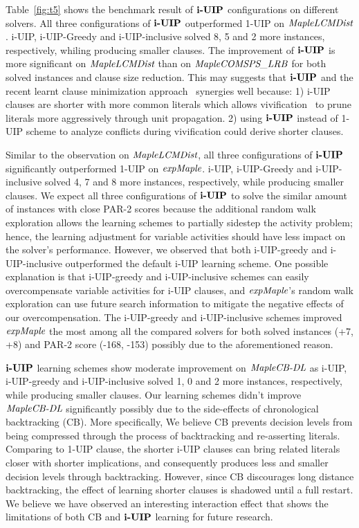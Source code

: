Table~\ref{fig:t5} shows the benchmark result of $\textbf{i-UIP}$ configurations on different solvers. All three configurations of $\textbf{i-UIP}$ outperformed 1-UIP on $\textit{MapleLCMDist}$. i-UIP, i-UIP-Greedy and i-UIP-inclusive solved 8, 5 and 2 more instances, respectively, whiling producing smaller clauses.  The improvement of $\textbf{i-UIP}$ is more significant on $\textit{MapleLCMDist}$ than on $\textit{MapleCOMSPS\_LRB}$ for both solved instances and clause size reduction. This may suggests that $\textbf{i-UIP}$ and the recent learnt clause minimization approach~\cite{} synergies well because: 1) i-UIP clauses are shorter with more common literals which allows vivification~\cite{} to prune literals more aggressively through unit propagation. 2) using $\textbf{i-UIP}$ instead of 1-UIP scheme to analyze conflicts during vivification could derive shorter clauses.

Similar to the observation on $\textit{MapleLCMDist}$, all three configurations of $\textbf{i-UIP}$ significantly outperformed 1-UIP on $\textit{expMaple}$. i-UIP, i-UIP-Greedy and i-UIP-inclusive solved 4, 7 and 8 more instances, respectively, while producing smaller clauses. We expect all three configurations of $\textbf{i-UIP}$ to solve the similar amount of instances with close PAR-2 scores because the additional random walk exploration allows the learning schemes to partially sidestep the activity problem; hence, the learning adjustment for variable activities should have less impact on the solver's performance. However, we observed that both i-UIP-greedy and i-UIP-inclusive outperformed the default i-UIP learning scheme. One possible explanation is that i-UIP-greedy and i-UIP-inclusive schemes can easily overcompensate variable activities for i-UIP clauses, and $\textit{expMaple}$'s random walk exploration can use future search information to mitigate the negative effects of our overcompensation. The i-UIP-greedy and i-UIP-inclusive schemes improved $\textit{expMaple}$ the most among all the compared solvers for both solved instances (+7, +8) and PAR-2 score (-168, -153) possibly due to the aforementioned reason.

$\textbf{i-UIP}$ learning schemes show moderate improvement on $\textit{MapleCB-DL}$ as i-UIP, i-UIP-greedy and i-UIP-inclusive solved 1, 0 and 2 more instances, respectively, while producing smaller clauses. Our learning schemes didn't improve $\textit{MapleCB-DL}$ significantly possibly due to the side-effects of chronological backtracking (CB). More specifically, We believe CB prevents decision levels from being compressed through the process of backtracking and re-asserting literals. Comparing to 1-UIP clause, the shorter i-UIP clauses can bring related literals closer with shorter implications, and consequently produces less and smaller decision levels through  backtracking. However, since CB discourages long distance backtracking, the effect of learning shorter clauses is shadowed until a full restart.  We believe we have observed an interesting interaction effect that shows the limitations of both CB and $\textbf{i-UIP}$ learning for future research.
